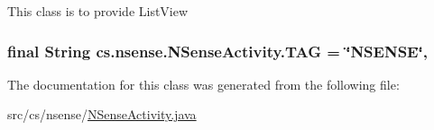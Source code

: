 This class is to provide List\-View \hypertarget{classcs_1_1nsense_1_1_n_sense_activity_a30a12082155068187f1dbd5ef495c923}{
\subsubsection[{T\-A\-G}]{\setlength{\rightskip}{0pt plus 5cm}final String cs.\-nsense.\-N\-Sense\-Activity.\-T\-A\-G = \char`\"{}N\-S\-E\-N\-S\-E\char`\"{}\hspace{0.3cm}{\ttfamily [static]}, {\ttfamily [private]}}}\label{classcs_1_1nsense_1_1_n_sense_activity_a30a12082155068187f1dbd5ef495c923}


The documentation for this class was generated from the following file\-:\begin{DoxyCompactItemize}
\item 
src/cs/nsense/\hyperlink{_n_sense_activity_8java}{N\-Sense\-Activity.\-java}\end{DoxyCompactItemize}
